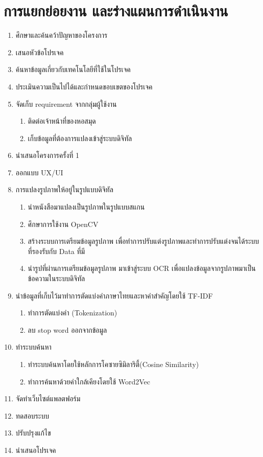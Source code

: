 \section{การแยกย่อยงาน และร่างแผนการดำเนินงาน}
\begin{enumerate}
    \item 	ศึกษาและค้นคว้าปัญหาของโครงการ
    \item 	เสนอหัวข้อโปรเจค 
    \item 	ค้นหาข้อมูลเกี่ยวกับเทคโนโลยีที่ใช้ในโปรเจค
    \item 	ประเมินความเป็นไปได้และกำหนดขอบเขตของโปรเจค 
    \item 	จัดเก็บ requirement จากกลุ่มผู้ใช้งาน
    \begin{enumerate}[label*=\arabic*.]
        \item   ติดต่อเจ้าหน้าที่ของหอสมุด
        \item   เก็บข้อมูลที่ต้องการแปลงเข้าสู่ระบบดิจิทัล
    \end{enumerate}
    \item 	นำเสนอโครงการครั้งที่ 1 
    \item 	ออกแบบ UX/UI
    \item 	การแปลงรูปภาพให้อยู่ในรูปแบบดิจิทัล
    \begin{enumerate}[label*=\arabic*.]
        \item  นำหนังสือมาแปลงเป็นรูปภาพในรูปแบบสแกน 
        \item  ศึกษาการใช้งาน OpenCV
        \item  สร้างระบบการเตรียมข้อมูลรูปภาพ เพื่อทำการปรับแต่งรูปภาพและทำการปรับแต่งจนได้ระบบที่รองรับกับ Data ที่มี
        \item  นำรูปที่ผ่านการเตรียมข้อมูลรูปภาพ มาเข้าสู่ระบบ OCR เพื่อแปลงข้อมูลจากรูปภาพมาเป็นข้อความในระบบดิจิทัล 
    \end{enumerate}
    \item 	นำข้อมูลที่เก็บไว้มาทำการตัดแบ่งคำภาษาไทยและหาคำสำคัญโดยใช้ TF-IDF 
    \begin{enumerate}[label*=\arabic*.]
        \item	ทำการตัดแบ่งคำ (Tokenization)
        \item	ลบ stop word ออกจากข้อมูล 
    \end{enumerate}
    \item	ทำระบบค้นหา 
    \begin{enumerate}[label*=\arabic*.]
       \item	ทำระบบค้นหาโดยใช้หลักการโคซายซิมิลาริตี้(Cosine Similarity)
       \item	ทำการค้นหาด้วยคำใกล้เคียงโดยใช้ Word2Vec 
    \end{enumerate}    
    \item   จัดทำเว็บไซต์แพลตฟอร์ม
    \item   ทดสอบระบบ
    \item   ปรับปรุงแก้ไข
    \item   นำเสนอโปรเจค
    \end{enumerate}

